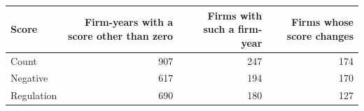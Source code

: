 \begin{tabular}{lrrr}
\toprule
Score & Firm-years with a score other than zero & Firms with such a firm-year & Firms whose score changes \\
\midrule
Count & 907 & 247 & 174 \\
Negative & 617 & 194 & 170 \\
Regulation & 690 & 180 & 127 \\
\bottomrule
\end{tabular}
